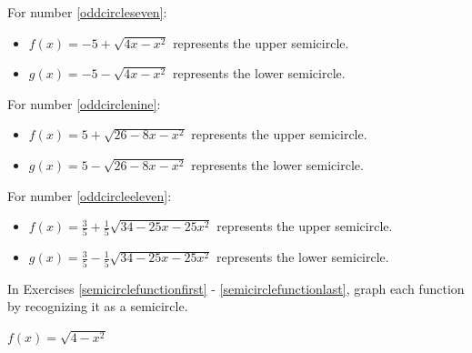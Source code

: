 \documentclass{ximera}
\begin{document}
\begin{problem}
\begin{solution}
\begin{itemize}
\end{itemize}


For number \ref{oddcircleseven}:

\begin{itemize}

\item  $f(x) = -5 + \sqrt{4x-x^2}$ represents the upper semicircle.

\item  $g(x) =  -5 - \sqrt{4x-x^2}$   represents the lower semicircle.

\end{itemize}

For number \ref{oddcirclenine}:

\begin{itemize}

\item  $f(x) = 5 + \sqrt{26-8x-x^2}$ represents the upper semicircle.

\item  $g(x) =  5 - \sqrt{26-8x-x^2}$   represents the lower semicircle.

\end{itemize}

For number \ref{oddcircleeleven}:

\begin{itemize}

\item  $f(x) = \frac{3}{5} + \frac{1}{5} \sqrt{34-25x-25x^2}$ represents the upper semicircle.

\item  $g(x) =  \frac{3}{5} - \frac{1}{5} \sqrt{34-25x-25x^2}$   represents the lower semicircle.

\end{itemize}
\end{solution}
\end{problem}

\begin{question}
In Exercises \ref{semicirclefunctionfirst} - \ref{semicirclefunctionlast}, graph each function by recognizing it as a semicircle.

\end{question}

\begin{problem}\label{semicirclefunctionfirst}
$f(x) = \sqrt{4-x^2}$

\begin{solution}
\begin{center} 
\end{center}
\end{solution}
\end{problem} 
\end{document}
